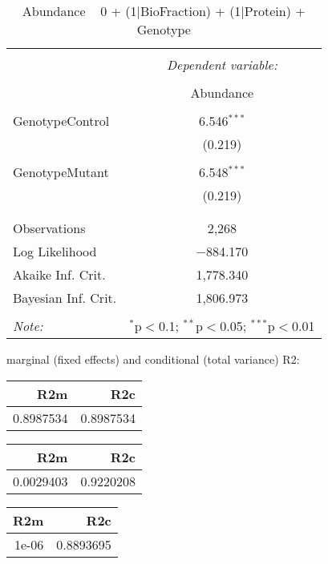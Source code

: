 \documentclass[11pt]{report}
\begin{document}
\begin{table}[!htbp] \centering 
  \caption{Abundance ~ 0 + (1|BioFraction) + (1|Protein) + Genotype} 
  \label{} 
\begin{tabular}{@{\extracolsep{5pt}}lc} 
\\[-1.8ex]\hline 
\hline \\[-1.8ex] 
 & \multicolumn{1}{c}{\textit{Dependent variable:}} \\ 
\cline{2-2} 
\\[-1.8ex] & Abundance \\ 
\hline \\[-1.8ex] 
 GenotypeControl & 6.546$^{***}$ \\ 
  & (0.219) \\ 
  & \\ 
 GenotypeMutant & 6.548$^{***}$ \\ 
  & (0.219) \\ 
  & \\ 
\hline \\[-1.8ex] 
Observations & 2,268 \\ 
Log Likelihood & $-$884.170 \\ 
Akaike Inf. Crit. & 1,778.340 \\ 
Bayesian Inf. Crit. & 1,806.973 \\ 
\hline 
\hline \\[-1.8ex] 
\textit{Note:}  & \multicolumn{1}{r}{$^{*}$p$<$0.1; $^{**}$p$<$0.05; $^{***}$p$<$0.01} \\ 
\end{tabular} 
\end{table} 
marginal (fixed effects) and conditional (total variance) R2:

\begin{tabular}{r|r}
\hline
R2m & R2c\\
\hline
0.8987534 & 0.8987534\\
\hline
\end{tabular}

\begin{tabular}{r|r}
\hline
R2m & R2c\\
\hline
0.0029403 & 0.9220208\\
\hline
\end{tabular}

\begin{tabular}{r|r}
\hline
R2m & R2c\\
\hline
1e-06 & 0.8893695\\
\hline
\end{tabular}
\end{document}
